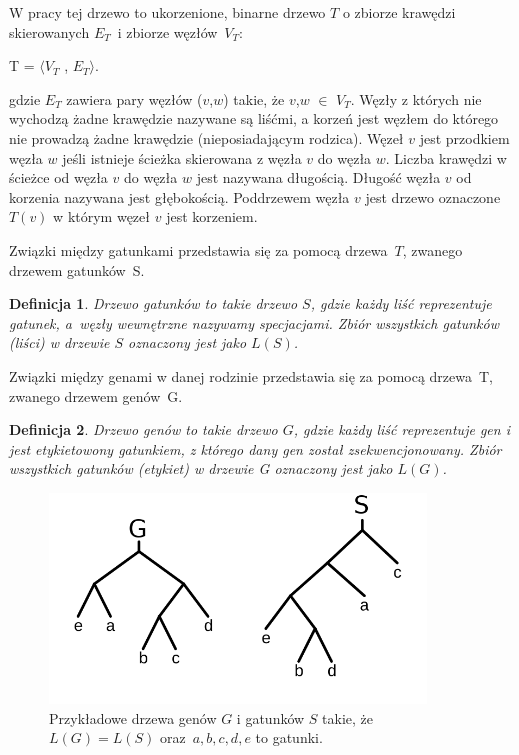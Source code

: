 \documentclass[licencjacka]{pracamgr}
\newtheorem{defi}{Definicja}[section]
\begin{document}
W pracy tej drzewo to ukorzenione, binarne drzewo $T$ o zbiorze krawędzi skierowanych $E_T$~i zbiorze węzłów~$V_T$:
\begin{center}
T = $\langle V_T$ , $E_T  \rangle$.
\end{center}
gdzie $E_T$ zawiera pary węzłów ($v$,$w$) takie, że $v$,$w$ $\in$ $V_T$. Węzły z których nie wychodzą żadne krawędzie nazywane są liśćmi, a korzeń jest węzłem do którego nie prowadzą żadne krawędzie (nieposiadającym rodzica). Węzeł $v$ jest przodkiem węzła $w$ jeśli istnieje ścieżka skierowana z węzła $v$ do węzła $w$. Liczba krawędzi w ścieżce od węzła $v$ do węzła $w$ jest nazywana długością. Długość węzła $v$ od korzenia nazywana jest głębokością. Poddrzewem węzła $v$ jest drzewo oznaczone $T(v)$ w którym węzeł $v$ jest korzeniem. 

Związki między gatunkami przedstawia się za pomocą drzewa~$T$, zwanego drzewem gatunków~S.
\begin{defi}\label{Drzewa gatunków}
  Drzewo gatunków to takie drzewo $S$, gdzie każdy liść reprezentuje gatunek, a~węzły wewnętrzne nazywamy specjacjami. Zbiór wszystkich gatunków (liści) w drzewie $S$ oznaczony jest jako $L(S)$. 
\end{defi}

Związki między genami w danej rodzinie przedstawia się za pomocą drzewa~T, zwanego drzewem genów~G.
\begin{defi}\label{Drzewa genów}
  Drzewo genów to takie drzewo $G$, gdzie każdy liść reprezentuje gen i jest etykietowony gatunkiem, z którego dany gen został zsekwencjonowany. Zbiór wszystkich gatunków (etykiet) w drzewie G oznaczony jest jako $L(G)$.
\end{defi}


\begin{figure}[H]
	\centering
	\includegraphics[width=100mm]{./pictures/spec_gen.png}
	\caption{Przykładowe drzewa genów $G$ i gatunków $S$ takie, że $L(G)=L(S)$ oraz~$a,b,c,d,e$ to gatunki.}
\end{figure}
\end{document}
